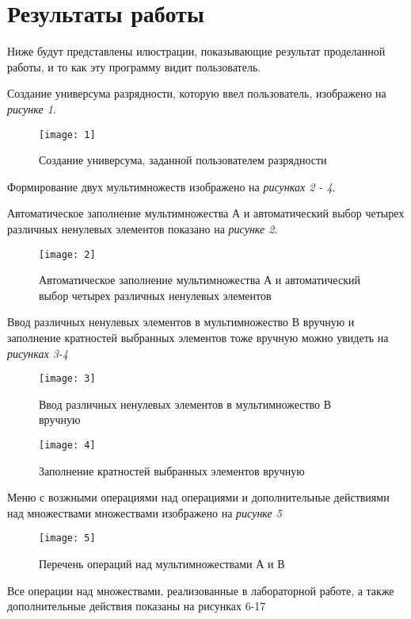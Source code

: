 \documentclass[10pt,a4paper,final]{article} %
\begin{document}
 \section {Результаты работы}
 \par Ниже будут представлены илюстрации, показывающие результат проделанной работы, и то как эту программу видит пользователь. 
 
 Создание универсума разрядности, которую ввел пользователь, изображено на \textit{рисунке 1}.
 
 \begin{figure}[h!]
 	\centering
 	\texttt{[image: 1]}
 	\caption{Создание универсума, заданной пользователем разрядности}
 \end{figure}
 
  Формирование двух мультимножеств изображено на \textit{рисунках 2 - 4}.
  
  Автоматическое заполнение мультимножества А  и автоматический выбор четырех различных ненулевых элементов показано на \textit{рисунке 2}.
 \begin{figure}[h!]
 	\centering
 	\texttt{[image: 2]}
 	\caption{Автоматическое заполнение мультимножества А  и автоматический выбор четырех различных ненулевых элементов}
 \end{figure}
  \clearpage
Ввод различных ненулевых элементов в мультимножество В вручную и заполнение кратностей выбранных элементов тоже вручную можно увидеть на \textit{рисунках 3-4}

\begin{figure}[h!]
	\centering
	\texttt{[image: 3]}
	\caption{Ввод различных ненулевых элементов в мультимножество В вручную}
	\texttt{[image: 4]}
		\caption{Заполнение кратностей выбранных элементов вручную }
\end{figure}
\clearpage

Меню с возжными операциями над операциями и дополнительные действиями над множествами множествами изображено на \textit{рисунке 5}
\begin{figure}[h!]
	\centering
		\texttt{[image: 5]}
	\caption{Перечень операций над мультимножествами А и В}
\end{figure}

		Все операции над множествами, реализованные в лабораторной работе, а также дополнительные действия показаны на рисунках 6-17
	
\end{document}
